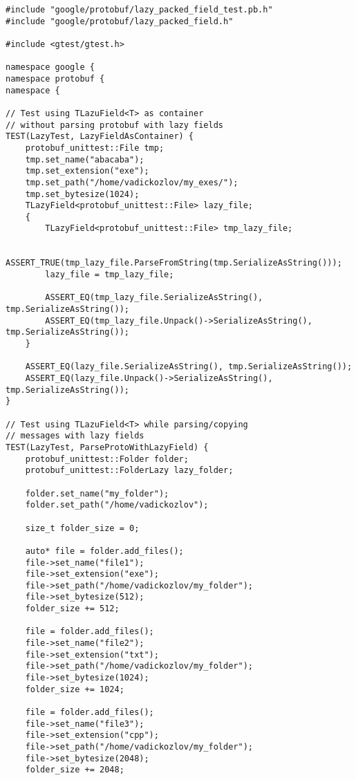 \begin{lstlisting}[style=CodeListing, label=sec_testing:code:tests, caption={Реализация тестов с помощью фреймворка Google Test}]
#include "google/protobuf/lazy_packed_field_test.pb.h"
#include "google/protobuf/lazy_packed_field.h"

#include <gtest/gtest.h>

namespace google {
namespace protobuf {
namespace {

// Test using TLazuField<T> as container
// without parsing protobuf with lazy fields
TEST(LazyTest, LazyFieldAsContainer) {
    protobuf_unittest::File tmp;
    tmp.set_name("abacaba");
    tmp.set_extension("exe");
    tmp.set_path("/home/vadickozlov/my_exes/");
    tmp.set_bytesize(1024);
    TLazyField<protobuf_unittest::File> lazy_file;
    {
        TLazyField<protobuf_unittest::File> tmp_lazy_file;

        ASSERT_TRUE(tmp_lazy_file.ParseFromString(tmp.SerializeAsString()));
        lazy_file = tmp_lazy_file;

        ASSERT_EQ(tmp_lazy_file.SerializeAsString(), tmp.SerializeAsString());
        ASSERT_EQ(tmp_lazy_file.Unpack()->SerializeAsString(), tmp.SerializeAsString());
    }

    ASSERT_EQ(lazy_file.SerializeAsString(), tmp.SerializeAsString());
    ASSERT_EQ(lazy_file.Unpack()->SerializeAsString(), tmp.SerializeAsString());
}

// Test using TLazuField<T> while parsing/copying
// messages with lazy fields
TEST(LazyTest, ParseProtoWithLazyField) {
    protobuf_unittest::Folder folder;
    protobuf_unittest::FolderLazy lazy_folder;

    folder.set_name("my_folder");
    folder.set_path("/home/vadickozlov");

    size_t folder_size = 0;

    auto* file = folder.add_files();
    file->set_name("file1");
    file->set_extension("exe");
    file->set_path("/home/vadickozlov/my_folder");
    file->set_bytesize(512);
    folder_size += 512;

    file = folder.add_files();
    file->set_name("file2");
    file->set_extension("txt");
    file->set_path("/home/vadickozlov/my_folder");
    file->set_bytesize(1024);
    folder_size += 1024;

    file = folder.add_files();
    file->set_name("file3");
    file->set_extension("cpp");
    file->set_path("/home/vadickozlov/my_folder");
    file->set_bytesize(2048);
    folder_size += 2048;


\end{lstlisting}
